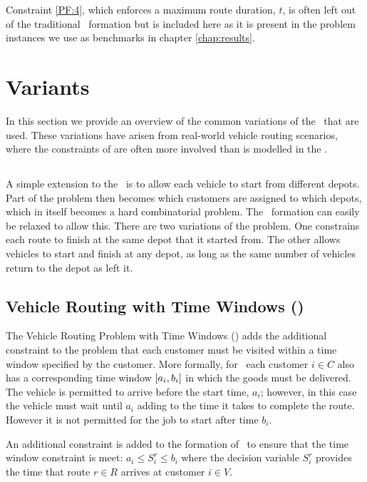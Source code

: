 Constraint \ref{PF:4}, which enforces a maximum route duration, $t$, is often left out of the traditional \CVRP\ formation but is included here as it is present in the problem instances we use as benchmarks in chapter \ref{chap:results}.

\section{Variants}
\label{sec:variants}

In this section we provide an overview of the common variations of the \VRP\ that are used. These variations have arisen from real-world vehicle routing scenarios, where the constraints of are often more involved than is modelled in the \CVRP. 

\subsection{\MDVRP}

A simple extension to the \CVRP\ is to allow each vehicle to start from different depots. Part of the problem then becomes which customers are assigned to which depots, which in itself becomes a hard combinatorial problem. The \CVRP\ formation can easily be relaxed to allow this. There are two variations of the problem. One constrains each route to finish at the same depot that it started from. The other allows vehicles to start and finish at any depot, as long as the same number of vehicles return to the depot as left it.

\subsection{Vehicle Routing with Time Windows (\VRPTW)}

The Vehicle Routing Problem with Time Windows (\VRPTW) adds the additional constraint to the problem that each customer must be visited within a time window specified by the customer. More formally, for \VRPTW\ each customer $i \in C$ also has a corresponding time window $[a_i, b_i]$ in which the goods must be delivered. The vehicle is permitted to arrive before the start time, $a_i$; however, in this case the vehicle must wait until $a_i$ adding to the time it takes to complete the route. However it is not permitted for the job to start after time $b_i$.

An additional constraint is added to the formation of \CVRP\ to ensure that the time window constraint is meet: $a_i \leq S_i^r \leq b_i$ where the decision variable $S_i^r$ provides the time that route $r \in R$ arrives at customer $i \in V$.  


